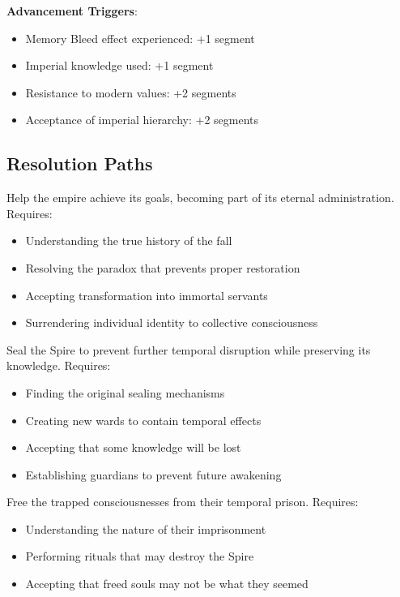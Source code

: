 \documentclass[11pt]{article}
\begin{document}
\textbf{Advancement Triggers}:
\begin{itemize}[leftmargin=*]
\item Memory Bleed effect experienced: +1 segment
\item Imperial knowledge used: +1 segment
\item Resistance to modern values: +2 segments
\item Acceptance of imperial hierarchy: +2 segments
\end{itemize}

\subsection*{Resolution Paths}

\begin{description}[leftmargin=*]
\item[The Restoration] Help the empire achieve its goals, becoming part of its eternal administration. Requires:
\begin{itemize}
\item Understanding the true history of the fall
\item Resolving the paradox that prevents proper restoration
\item Accepting transformation into immortal servants
\item Surrendering individual identity to collective consciousness
\end{itemize}
\item[The Preservation] Seal the Spire to prevent further temporal disruption while preserving its knowledge. Requires:
\begin{itemize}
\item Finding the original sealing mechanisms
\item Creating new wards to contain temporal effects
\item Accepting that some knowledge will be lost
\item Establishing guardians to prevent future awakening
\end{itemize}
\item[The Liberation] Free the trapped consciousnesses from their temporal prison. Requires:
\begin{itemize}
\item Understanding the nature of their imprisonment
\item Performing rituals that may destroy the Spire
\item Accepting that freed souls may not be what they seemed

\end{itemize}
\end{description}
\end{document}
